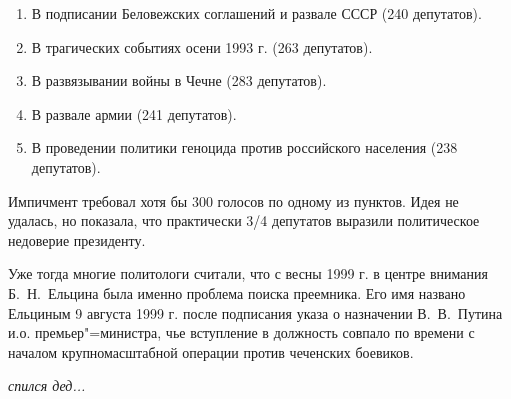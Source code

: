 \begin{enumerate}
  \item В подписании Беловежских соглашений и развале СССР (240 депутатов).
  \item В трагических событиях осени 1993 г. (263 депутатов).
  \item В развязывании войны в Чечне (283 депутатов).
  \item В развале армии (241 депутатов).
  \item В проведении политики геноцида против российского населения (238 депутатов).
\end{enumerate}

Импичмент требовал хотя бы 300 голосов по одному из пунктов. Идея не удалась, но показала, что практически 3/4 депутатов выразили политическое недоверие президенту.

Уже тогда многие политологи считали, что с весны 1999 г. в центре внимания Б.~Н.~Ельцина была именно проблема поиска преемника. Его имя названо Ельциным 9 августа 1999 г. после подписания указа о назначении В.~В.~Путина и.о. премьер"=министра, чье вступление в должность совпало по времени с началом крупномасштабной операции против чеченских боевиков.

{\it спился дед...}
